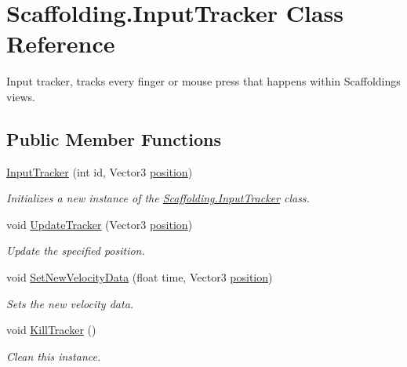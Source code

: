 \hypertarget{class_scaffolding_1_1_input_tracker}{\section{Scaffolding.\-Input\-Tracker Class Reference}
\label{class_scaffolding_1_1_input_tracker}
}


Input tracker, tracks every finger or mouse press that happens within Scaffoldings views.  


\subsection*{Public Member Functions}
\begin{DoxyCompactItemize}
\item 
\hyperlink{class_scaffolding_1_1_input_tracker_aa20fb06b3415f79e7d79c9cbfabc0a99}{Input\-Tracker} (int id, Vector3 \hyperlink{class_scaffolding_1_1_input_tracker_ab29b6a8291f5f49035544a3c6e592be0}{position})
\begin{DoxyCompactList}\small\item\em Initializes a new instance of the \hyperlink{class_scaffolding_1_1_input_tracker}{Scaffolding.\-Input\-Tracker} class. \end{DoxyCompactList}\item 
void \hyperlink{class_scaffolding_1_1_input_tracker_aedce3144315d02e9713c7fddacafe5aa}{Update\-Tracker} (Vector3 \hyperlink{class_scaffolding_1_1_input_tracker_ab29b6a8291f5f49035544a3c6e592be0}{position})
\begin{DoxyCompactList}\small\item\em Update the specified position. \end{DoxyCompactList}\item 
void \hyperlink{class_scaffolding_1_1_input_tracker_afa1ed7b953c814e9b45a6348c6d08c85}{Set\-New\-Velocity\-Data} (float time, Vector3 \hyperlink{class_scaffolding_1_1_input_tracker_ab29b6a8291f5f49035544a3c6e592be0}{position})
\begin{DoxyCompactList}\small\item\em Sets the new velocity data. \end{DoxyCompactList}\item 
void \hyperlink{class_scaffolding_1_1_input_tracker_a38e432bbd719c51f738311b153d6df70}{Kill\-Tracker} ()
\begin{DoxyCompactList}\small\item\em Clean this instance. \end{DoxyCompactList}\item 

\end{DoxyCompactItemize}
